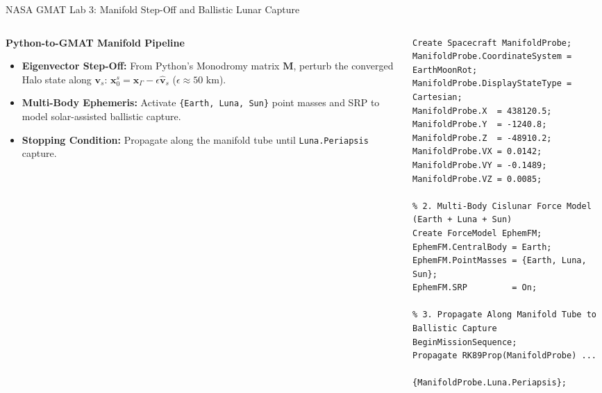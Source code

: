 \documentclass[aspectratio=169, 10pt]{beamer}
\begin{document}
\begin{frame}[fragile]{NASA GMAT Lab 3: Manifold Step-Off and Ballistic Lunar Capture}
    \begin{columns}[t]
        \begin{column}{0.46\textwidth}
            \begin{block}{\textbf{Python-to-GMAT Manifold Pipeline}}
                \scriptsize
                \begin{itemize}\setlength{\itemsep}{2pt}
                    \item \textbf{Eigenvector Step-Off:} From Python's Monodromy matrix $\mathbf{M}$, perturb the converged Halo state along $\mathbf{v}_s$:
                    $\mathbf{x}_0^s = \mathbf{x}_\Gamma - \epsilon \hat{\mathbf{v}}_s$ ($\epsilon \approx 50\text{ km}$).
                    \item \textbf{Multi-Body Ephemeris:} Activate \texttt{\{Earth, Luna, Sun\}} point masses and SRP to model solar-assisted ballistic capture.
                    \item \textbf{Stopping Condition:} Propagate along the manifold tube until \texttt{Luna.Periapsis} capture.
                \end{itemize}
            \end{block}
        \end{column}
        
        \begin{column}{0.52\textwidth}
\begin{lstlisting}[style=gmatstyle]
% 1. State Perturbed Along Stable Manifold Eigenvector v_s
Create Spacecraft ManifoldProbe;
ManifoldProbe.CoordinateSystem = EarthMoonRot;
ManifoldProbe.DisplayStateType = Cartesian;
ManifoldProbe.X  = 438120.5;   ManifoldProbe.Y  = -1240.8;
ManifoldProbe.Z  = -48910.2;
ManifoldProbe.VX = 0.0142;     ManifoldProbe.VY = -0.1489;
ManifoldProbe.VZ = 0.0085;

% 2. Multi-Body Cislunar Force Model (Earth + Luna + Sun)
Create ForceModel EphemFM;
EphemFM.CentralBody = Earth;
EphemFM.PointMasses = {Earth, Luna, Sun};
EphemFM.SRP         = On;

% 3. Propagate Along Manifold Tube to Ballistic Capture
BeginMissionSequence;
Propagate RK89Prop(ManifoldProbe) ...
          {ManifoldProbe.Luna.Periapsis};
\end{lstlisting}
        \end{column}
    \end{columns}
\end{frame}
\end{document}
